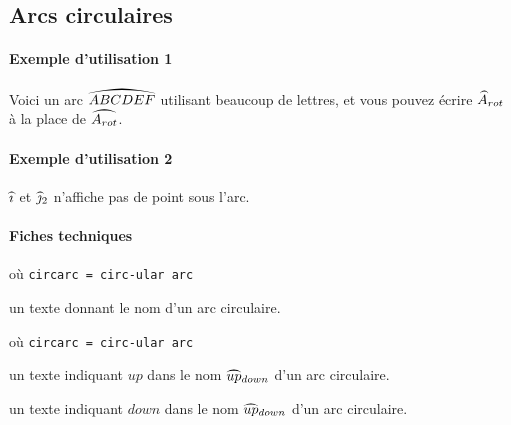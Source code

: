 \documentclass[12pt,a4paper]{article}
\begin{document}

\subsection{Arcs circulaires}

\paragraph{Exemple d'utilisation 1}

\begin{tcblisting}{}
Voici un arc $\circarc{ABCDEF}$ utilisant beaucoup de lettres, et vous pouvez écrire
$\circarc*{A}{rot}$ à la place de $\circarc{A_{rot}}$.
\end{tcblisting}


\paragraph{Exemple d'utilisation 2}

\begin{tcblisting}{}
$\circarc{i}$ et $\circarc*{j}{2}$ n'affiche pas de point sous l'arc.
\end{tcblisting}



\paragraph{Fiches techniques}

 où \quad \verb+circarc = circ-ular arc+

\IDarg{} un texte donnant le nom d'un arc circulaire.


\bigskip


 où \quad \verb+circarc = circ-ular arc+

 un texte indiquant $up$ dans le nom $\circarc*{up}{down}$ d'un arc circulaire.

 un texte indiquant $down$ dans le nom $\circarc*{up}{down}$ d'un arc circulaire.
\end{document}
